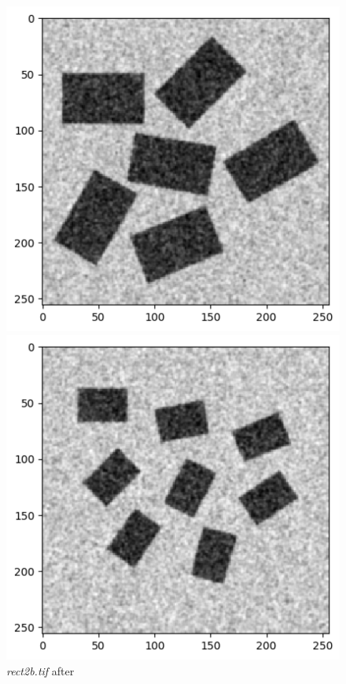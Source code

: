 \documentclass[runningheads]{llncs}
\begin{document}
\begin{figure}[h!]
\begin{minipage}[h]{0.47\linewidth}
\begin{center}
\includegraphics[width=1\linewidth]{Report/Result_Images/image_hb2.png} 
\caption{\emph{rect2b.tif} after}
\label{hb2-Gaussian and Kernel 1}
\end{center}
\end{minipage}
\vfill
\vspace{0.2 cm}
\begin{minipage}[h]{0.47\linewidth}
\begin{center}
\includegraphics[width=1\linewidth]{Report/Result_Images/image_hb3.png} 

\end{center}
\end{minipage}
\end{figure}
\end{document}
